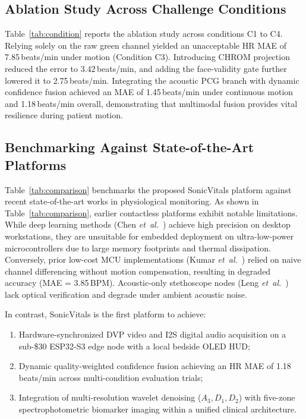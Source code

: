 \documentclass[journal]{IEEEtran}
\begin{document}
\subsection{Ablation Study Across Challenge Conditions}
Table~\ref{tab:condition} reports the ablation study across conditions C1 to C4. Relying solely on the raw green channel yielded an unacceptable HR MAE of 7.85\,beats/min under motion (Condition C3). Introducing CHROM projection reduced the error to 3.42\,beats/min, and adding the face-validity gate further lowered it to 2.75\,beats/min. Integrating the acoustic PCG branch with dynamic confidence fusion achieved an MAE of 1.45\,beats/min under continuous motion and 1.18\,beats/min overall, demonstrating that multimodal fusion provides vital resilience during patient motion.

\subsection{Benchmarking Against State-of-the-Art Platforms}
Table~\ref{tab:comparison} benchmarks the proposed SonicVitals platform against recent state-of-the-art works in physiological monitoring. As shown in Table~\ref{tab:comparison}, earlier contactless platforms exhibit notable limitations. While deep learning methods (Chen \textit{et~al.}~\cite{chen2021physnet}) achieve high precision on desktop workstations, they are unsuitable for embedded deployment on ultra-low-power microcontrollers due to large memory footprints and thermal dissipation. Conversely, prior low-cost MCU implementations (Kumar \textit{et~al.}~\cite{kumar2022esp32}) relied on naive channel differencing without motion compensation, resulting in degraded accuracy (MAE = 3.85\,BPM). Acoustic-only stethoscope nodes (Leng \textit{et~al.}~\cite{leng2023stethoscope}) lack optical verification and degrade under ambient acoustic noise.

In contrast, SonicVitals is the first platform to achieve:
\begin{enumerate}
  \item Hardware-synchronized DVP video and I2S digital audio acquisition on a sub-\$30 ESP32-S3 edge node with a local bedside OLED HUD;
  \item Dynamic quality-weighted confidence fusion achieving an HR MAE of 1.18\,beats/min across multi-condition evaluation trials;
  \item Integration of multi-resolution wavelet denoising ($A_3, D_1, D_2$) with five-zone spectrophotometric biomarker imaging within a unified clinical architecture.
\end{enumerate}
\end{document}
